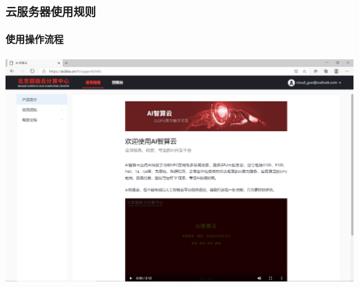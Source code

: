 \documentclass[10pt]{beamer}
\begin{document}
    \begin{frame}
        \frametitle{云服务器使用规则}
            \framesubtitle{使用操作流程}

            \centering
            \href{https://ai.blsc.cn/\#/support/info}{
                \includegraphics[scale=0.2]{src/img/Welcome.png}
                }

    \end{frame}
\end{document}
